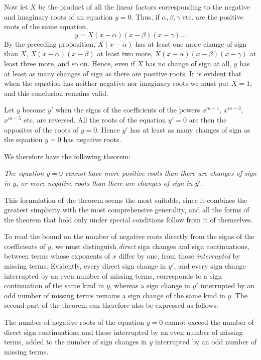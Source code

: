 Now let $X$ be the product of all the linear factors corresponding to the negative and imaginary roots of an equation $y=0$. Thus, if $\alpha,\beta,\gamma$ etc. are the positive roots of the same equation,
\[
y=X(x-\alpha)(x-\beta)(x-\gamma)\ldots
\]
By the preceding proposition, $X(x-\alpha)$ has at least one more change of sign than $X$, $X(x-\alpha)(x-\beta)$ at least two more, $X(x-\alpha)(x-\beta)(x-\gamma)$ at least three more, and so on. Hence, even if $X$ has no change of sign at all, $y$ has at least as many changes of sign as there are positive roots. It is evident that when the equation has neither negative nor imaginary roots we must put $X=1$, and this conclusion remains valid.

Let $y$ become $y'$ when the signs of the coefficients of the powers $x^{m-1}$, $x^{m-3}$, $x^{m-5}$ etc. are reversed. All the roots of the equation $y'=0$ are then the opposites of the roots of $y=0$. Hence $y'$ has at least as many changes of sign as the equation $y=0$ has negative roots.
\par
{}
We therefore have the following theorem:

\emph{The equation $y=0$ cannot have more positive roots than there are changes of sign in $y$, or more negative roots than there are changes of sign in $y'$.}

This formulation of the theorem seems the most suitable, since it combines the greatest simplicity with the most comprehensive generality, and all the forms of the theorem that hold only under special conditions follow from it of themselves.

To read the bound on the number of negative roots directly from the signs of the coefficients of $y$, we must distinguish \emph{direct} sign changes and sign continuations, between terms whose exponents of $x$ differ by one, from those \emph{interrupted} by missing terms. Evidently, every direct sign change in $y'$, and every sign change interrupted by an even number of missing terms, corresponds to a sign continuation of the same kind in $y$, whereas a sign change in $y'$ interrupted by an odd number of missing terms remains a sign change of the same kind in $y$. The second part of the theorem can therefore also be expressed as follows:

The number of negative roots of the equation $y=0$ cannot exceed the number of direct sign continuations and those interrupted by an even number of missing terms, added to the number of sign changes in $y$ interrupted by an odd number of missing terms.

